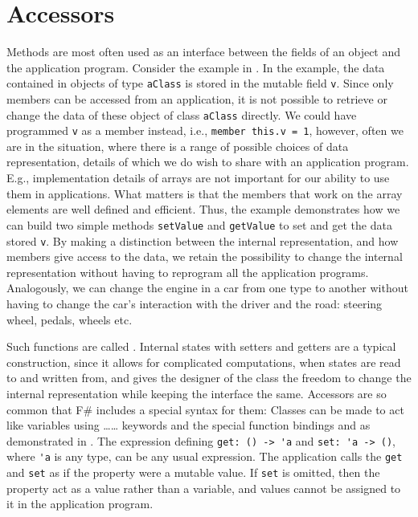 \section{Accessors}
Methods are most often used as an interface between the fields of an object and the application program. Consider the example in .
%
% 
In the example, the data contained in objects of type \lstinline{aClass} is stored in the mutable field \lstinline{v}. Since only members can be accessed from an application, it is not possible to retrieve or change the data of these object of class \lstinline{aClass} directly. We could have programmed \lstinline{v} as a member instead, i.e., \lstinline{member this.v = 1}, however, often we are in the situation, where there is a range of possible choices of data representation, details of which we do wish to share with an application program. E.g., implementation details of arrays are not important for our ability to use them in applications. What matters is that the members that work on the array elements are well defined and efficient. Thus, the example demonstrates how we can build two simple methods \lstinline{setValue} and \lstinline{getValue} to set and get the data stored \lstinline{v}. By making a distinction between the internal representation, and how members give access to the data, we retain the possibility to change the internal representation without having to reprogram all the application programs. Analogously, we can change the engine in a car from one type to another without having to change the car's interaction with the driver and the road: steering wheel, pedals, wheels etc.

Such functions are called .  Internal states with setters and getters are a typical construction, since it allows for complicated computations, when states are read to and written from, and gives the designer of the class the freedom to change the internal representation while keeping the interface the same. Accessors are so common that F\# includes a special syntax for them: Classes can be made to act like variables using \dots{}\dots{} keywords and the special function bindings  and  as demonstrated in .
%
% 
The expression defining \lstinline{get: () -> 'a} and \lstinline{set: 'a -> ()}, where \lstinline{'a} is any type, can be any usual expression. The application calls the \lstinline{get} and \lstinline{set} as if the property were a mutable value. If \lstinline{set} is omitted, then the property act as a value rather than a variable, and values cannot be assigned to it in the application program.

